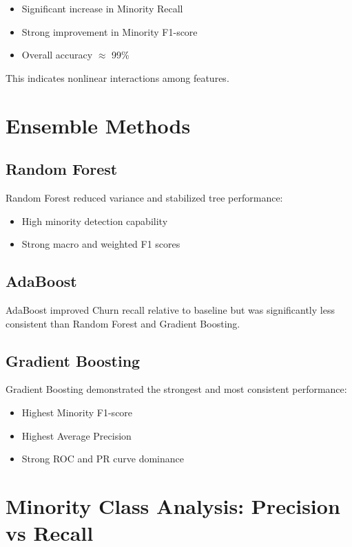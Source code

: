 \documentclass[12pt]{article}
\begin{document}
	\begin{itemize}
		\item Significant increase in Minority Recall
		\item Strong improvement in Minority F1-score
		\item Overall accuracy $\approx$ 99\%
	\end{itemize}
	
	This indicates nonlinear interactions among features.
	
	\section{Ensemble Methods}
	
	\subsection{Random Forest}
	
	Random Forest reduced variance and stabilized tree performance:
	
	\begin{itemize}
		\item High minority detection capability
		\item Strong macro and weighted F1 scores
	\end{itemize}
	
	\subsection{AdaBoost}
	
	AdaBoost improved Churn recall relative to baseline but was significantly less consistent than Random Forest and Gradient Boosting. 
	
	\subsection{Gradient Boosting}
	
	Gradient Boosting demonstrated the strongest and most consistent performance:
	
	\begin{itemize}
		\item Highest Minority F1-score
		\item Highest Average Precision
		\item Strong ROC and PR curve dominance
	\end{itemize}
	
	\section{Minority Class Analysis: Precision vs Recall}
	
\end{document}
